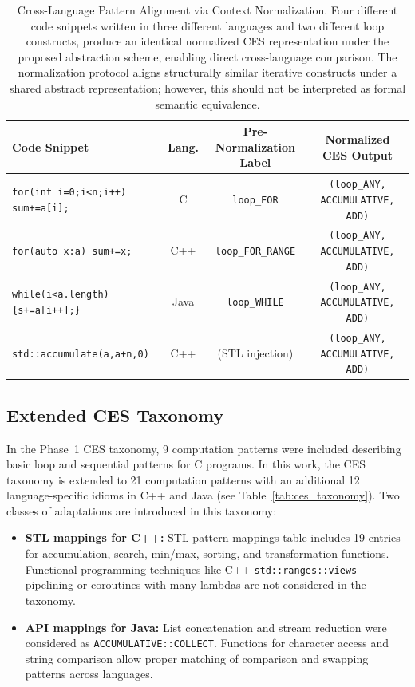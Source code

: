 \begin{table}[t]
\caption{Cross-Language Pattern Alignment via Context Normalization. Four different code snippets written in three different languages and two different loop constructs, produce an identical normalized CES representation under the proposed abstraction scheme, enabling direct cross-language comparison. The normalization protocol aligns structurally similar iterative constructs under a shared abstract representation; however, this should not be interpreted as formal semantic equivalence.}
\label{tab:context_norm_illustration}
\centering
\begin{tabular}{|l|c|c|c|}
\hline
\textbf{Code Snippet} & \textbf{Lang.} & \textbf{Pre-Normalization Label} & \textbf{Normalized CES Output} \\
\hline
\texttt{for(int i=0;i<n;i++) sum+=a[i];} & C    & \texttt{loop\_FOR}        & \texttt{(loop\_ANY, ACCUMULATIVE, ADD)} \\
\hline
\texttt{for(auto x:a) sum+=x;}           & C++  & \texttt{loop\_FOR\_RANGE}  & \texttt{(loop\_ANY, ACCUMULATIVE, ADD)} \\
\hline
\texttt{while(i<a.length)\{s+=a[i++];\}} & Java & \texttt{loop\_WHILE}      & \texttt{(loop\_ANY, ACCUMULATIVE, ADD)} \\
\hline
\texttt{std::accumulate(a,a+n,0)}        & C++  & (STL injection)            & \texttt{(loop\_ANY, ACCUMULATIVE, ADD)} \\
\hline
\end{tabular}
\end{table}

\subsection{Extended CES Taxonomy}
\label{subsec:ces_taxonomy}
In the Phase~1 CES taxonomy, 9 computation patterns were included describing basic loop and sequential patterns for C programs. In this work, the CES taxonomy is extended to 21 computation patterns with an additional 12 language-specific idioms in C++ and Java (see Table~\ref{tab:ces_taxonomy}). Two classes of adaptations are introduced in this taxonomy:
\begin{itemize}
    \item \textbf{STL mappings for C++:} STL pattern mappings table includes 19 entries for accumulation, search, min/max, sorting, and transformation functions. Functional programming techniques like C++ \texttt{std::ranges::views} pipelining or coroutines with many lambdas are not considered in the taxonomy.
    \item \textbf{API mappings for Java:} List concatenation and stream reduction were considered as \texttt{ACCUMULATIVE::COLLECT}. Functions for character access and string comparison allow proper matching of comparison and swapping patterns across languages.
\end{itemize}

